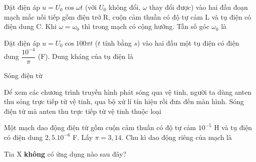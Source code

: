 \documentclass[11pt]{article}
\begin{document}
\begin{vnmultiplechoice}[ rearrange=yes, keycolumns=3]
\begin{question} %
Đặt điện áp $u =U_0\cos\omega t$ (với $U_0$ không đổi,  $\omega$ thay đổi được) vào hai đầu đoạn mạch mắc
nối tiếp gồm điện trở R, cuộn cảm thuần có độ tự cảm L và tụ điện có điện dung C. Khi  $\omega =  \omega_0$ thì
trong mạch có cộng hưởng. Tần số góc  $\omega_0$ là
\datcot
\bonpa
{}
{}
{}
{}
\end{question}

\begin{question} %
 Đặt điện áp $u=U_0\cos 100 \pi t$ ($t$ tính bằng $s$) vào hai đầu một tụ điện có điện dung
$\dfrac{10^{-4}}{\pi}$ (F).
Dung kháng của tụ điện là
\datcot
\bonpa
{}
{}
{}
{}
\end{question}



\begin{question} %
Sóng điện từ
\datcot[4]
\bonpa
{}
{}
{}
{}
\end{question}



\begin{question} %
Để xem các chương trình truyền hình phát sóng qua vệ tinh, người ta dùng anten thu
sóng trực tiếp từ vệ tinh, qua bộ xử lí tín hiệu rồi đưa đến màn hình. Sóng điện từ mà anten thu
trực tiếp từ vệ tinh thuộc loại
\datcot
\bonpa
{}
{}
{}
{}
\end{question}

\begin{question} %
Một mạch dao động điện từ gồm cuộn cảm thuần có độ tự cảm $10^{-5}$ H và tụ điện có điện
dung $2,5.10^{-6} $ F. Lấy $\pi = 3,14$. Chu kì dao động riêng của mạch là
\datcot
\bonpa
{}
{}
{}
{}
\end{question}

\begin{question} %
 Tia X \textbf{không} có ứng dụng nào sau đây?
\datcot[2]
\bonpa
{}
{}
{}
{}
\end{question}


\end{vnmultiplechoice}
\end{document}
